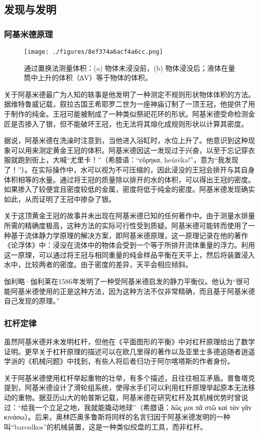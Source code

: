 \subsection{发现与发明} 
\subsubsection{阿基米德原理}
\begin{figure}[ht]
\centering
\texttt{[image: ./figures/8ef374a6acf4a6cc.png]}
\caption{通过置换法测量体积：(a) 物体未浸没前，(b) 物体浸没后；液体在量筒中上升的体积（∆V）等于物体的体积。} \label{fig_Archim_3}
\end{figure}
关于阿基米德最广为人知的轶事是他发明了一种测定不规则形状物体体积的方法。据维特鲁威记载，叙拉古国王希耶罗二世为一座神庙订制了一顶王冠，他提供了用于制作的纯金。王冠可能被制成了一种类似祭祀花环的形状。阿基米德受命检测金匠是否掺入了银，但不能破坏王冠，也无法将其熔化成规则形状以计算其密度。

据说，阿基米德在洗澡时注意到，当他进入浴缸时，水位上升了。他意识到这种现象可以用来测定黄金王冠的体积。阿基米德因这一发现过于兴奋，以至于忘记穿衣服就跑到街上，大喊“尤里卡！”（希腊语：“εὕρηκα, heúrēka!”，意为“我发现了！”）。在实际操作中，水可以视为不可压缩的，因此浸没的王冠会排开与其自身体积相等的水量。通过将王冠的质量除以排开的水的体积，可以得出王冠的密度。如果掺入了较便宜且密度较低的金属，密度将低于纯金的密度。阿基米德发现确实如此，从而证明了王冠中掺杂了银。

关于这顶黄金王冠的故事并未出现在阿基米德已知的任何著作中。由于测量水排量所需的精确度极高，这种方法的实际可行性受到质疑。阿基米德可能转而使用了一种基于流体静力学原理的解决方案，即阿基米德原理，这一原理记录在他的著作《论浮体》中：浸没在流体中的物体会受到一个等于所排开流体重量的浮力。利用这一原理，可以通过将王冠与相同重量的纯金样品平衡在天平上，然后将装置浸入水中，比较两者的密度。由于密度的差异，天平会相应倾斜。

伽利略·伽利莱在1586年发明了一种受阿基米德启发的静力平衡仪。他认为“很可能阿基米德使用的正是这种方法，因为这种方法不仅非常精确，而且基于阿基米德自己发现的原理。”
\subsubsection{杠杆定律}
虽然阿基米德并未发明杠杆，但他在《平面图形的平衡》中对杠杆原理给出了数学证明。更早关于杠杆原理的描述可以在欧几里得的著作以及亚里士多德追随者逍遥学派的《机械问题》中找到，有些人将后者归功于阿尔喀塔斯的作者身份。

关于阿基米德使用杠杆举起重物的壮举，有多个描述，且往往相互矛盾。普鲁塔克提到，阿基米德设计了滑轮组系统，使得水手们可以利用杠杆原理举起原本无法移动的重物。据亚历山大的帕普斯记载，阿基米德在研究杠杆及其机械优势时曾说过：“给我一个立足之地，我就能撬动地球”（希腊语：δῶς μοι πᾶ στῶ καὶ τὰν γᾶν κινάσω）。后来，奥林匹奥多鲁斯将同样的名言归因于阿基米德发明的一种叫“baroulkos”的机械装置，这是一种类似绞盘的工具，而非杠杆。
